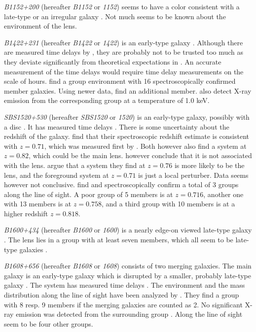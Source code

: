 \documentclass[10pt]{article}
\begin{document}
\textit{B1152+200} (hereafter \textit{B1152} or \textit{1152}) seems to have a color consistent with a late-type or an irregular galaxy \citep{2000A&A...357..115T}. Not much seems to be known about the environment of the lens.

\textit{B1422+231} (hereafter \textit{B1422} or \textit{1422}) is an early-type galaxy \citep{1996ApJ...462L..53I}. Although there are measured time delays by \cite{2001MNRAS.326.1403P}, they are probably not to be trusted too much as they deviate significantly from theoretical expectations in \cite{2003AJ....126...29R}. An accurate measurement of the time delays would require time delay measurements on the scale of hours. \cite{2006ApJ...641..169M} find a group environment with 16 spectroscopically confirmed member galaxies. Using newer data, \cite{2011ApJ...726...84W} find an additional member. \cite{2004ApJ...610..686G} also detect X-ray emission from the corresponding group at a temperature of 1.0 keV.

\textit{SBS1520+530} (hereafter \textit{SBS1520} or \textit{1520}) is an early-type galaxy, possibly with a disc \citep{2008ApJ...673..778A}. It has measured time delays \citep{2011A&A...536A..44E}. There is some uncertainty about the redshift of the galaxy. \cite{2002A&A...391..481B} find that their spectroscopic redshift estimate is consistent with $z=0.71$, which was measured first by \cite{1997A&A...318L..67C}. Both however also find a system at $z=0.82$, which could be the main lens. \cite{2002A&A...391..481B} however conclude that it is not associated with the lens. \cite{2008ApJ...673..778A} argue that a system they find at $z=0.76$ is more likely to be the lens, and the foreground system at $z=0.71$ is just a local perturber. Data seems however not conclusive. \cite{2008ApJ...673..778A} find and spectroscopically confirm a total of 3 groups along the line of sight. A poor group of 5 members is at $z=0.716$, another one with 13 members is at $z=0.758$, and a third group with 10 members is at a higher redshift $z=0.818$.

\textit{B1600+434} (hereafter \textit{B1600} or \textit{1600}) is a nearly edge-on viewed late-type galaxy \citep{1997A&A...317L..39J}. The lens lies in a group with at least seven members, which all seem to be late-type galaxies \citep{2007AJ....134..668A}.

\textit{B1608+656} (hereafter \textit{B1608} or \textit{1608}) consists of two merging galaxies. The main galaxy is an early-type galaxy which is disrupted by a smaller, probably late-type galaxy \citep{2003ApJ...584..100S}. The system has measured time delays \citep{2002ApJ...581..823F}. The environment and the mass distribution along the line of sight have been analyzed by \cite{2006ApJ...642...30F}. They find a group with 8 resp. 9 members if the merging galaxies are counted as 2. No significant X-ray emission was detected from the surrounding group \citep{2005ApJ...625..633D}. Along the line of sight seem to be four other groups.
\end{document}
